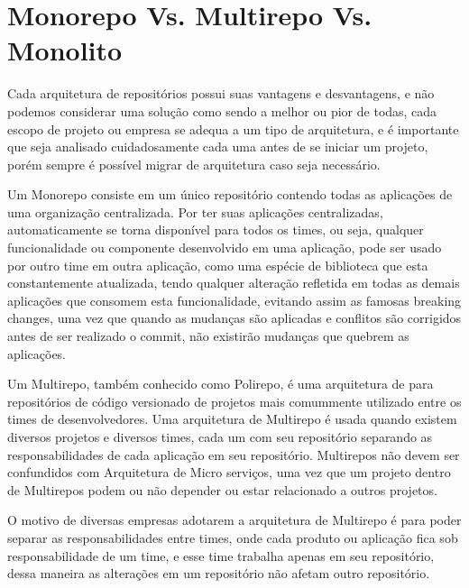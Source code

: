 \section{Monorepo Vs. Multirepo Vs. Monolito}

Cada arquitetura de repositórios possui suas vantagens e desvantagens, e não podemos considerar uma solução como sendo a melhor ou pior de todas, cada escopo de projeto ou empresa se adequa a um tipo de arquitetura, e é importante que seja analisado cuidadosamente cada uma antes de se iniciar um projeto, porém sempre é possível migrar de arquitetura caso seja necessário.  

Um Monorepo consiste em um único repositório contendo todas as aplicações de uma organização centralizada. Por ter suas aplicações centralizadas, automaticamente se torna disponível para todos os times, ou seja, qualquer funcionalidade ou componente desenvolvido em uma aplicação, pode ser usado por outro time em outra aplicação, como uma espécie de biblioteca que esta constantemente atualizada, tendo qualquer alteração refletida em todas as demais aplicações que consomem esta funcionalidade, evitando assim as famosas breaking changes, uma vez que quando as mudanças são aplicadas e conflitos são corrigidos antes de ser realizado o commit, não existirão mudanças que quebrem as aplicações. 

Um Multirepo, também conhecido como Polirepo, é uma arquitetura de para repositórios de código versionado de projetos mais comummente utilizado entre os times de desenvolvedores. Uma arquitetura de Multirepo é usada quando existem diversos projetos e diversos times, cada um com seu repositório separando as responsabilidades de cada aplicação em seu repositório. Multirepos não devem ser confundidos com Arquitetura de Micro serviços, uma vez que um projeto dentro de Multirepos podem ou não depender ou estar relacionado a outros projetos. 

O motivo de diversas empresas adotarem a arquitetura de Multirepo é para poder separar as responsabilidades entre times, onde cada produto ou aplicação fica sob responsabilidade de um time, e esse time trabalha apenas em seu repositório, dessa maneira as alterações em um repositório não afetam outro repositório. 

